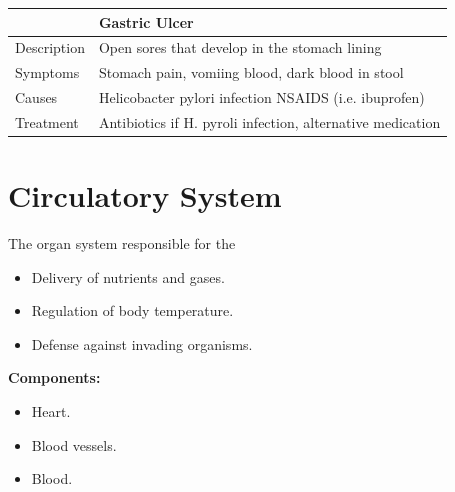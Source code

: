 \documentclass[12pt]{report}
\begin{document}
\begin{table}[h!]
    \renewcommand{\arraystretch}{1.5}
    \setlength{\tabcolsep}{10pt}
    \setlength{\arrayrulewidth}{0.25mm}

    \begin{center}
        \vspace{0.5em}
    \begin{tabular}{|l|l|}
        \hline
         & Gastric Ulcer \\ 
        \hline
        Description & Open sores that develop in the stomach lining \\
        \hline
        Symptoms & Stomach pain, vomiing blood, dark blood in stool\\ 
        \hline 
        Causes & Helicobacter pylori infection NSAIDS (i.e. ibuprofen)\\ 
        \hline
        Treatment & Antibiotics if H. pyroli infection, alternative medication\\ 
        \hline
        \end{tabular}
    \end{center}
\end{table}

\section{Circulatory System}
\begin{definition}
    The organ system responsible for the 
    \begin{itemize}
        \item{Delivery of nutrients and gases.}
        \item{Regulation of body temperature.}
        \item{Defense against invading organisms.}
    \end{itemize}
    \textbf{Components:}
    \begin{itemize}
        \item{Heart.}
        \item{Blood vessels.}
        \item{Blood.}
    \end{itemize}
\end{definition}
\end{document}
